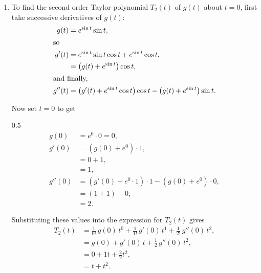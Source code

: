\begin{enumerate}
\begin{enumerate}
                \bigskip

            \item To find the second order Taylor polynomial $T_2(t)$ of $g(t)$ about $t = 0$, first take successive derivatives of $g(t)$:
                \begin{align*}
                    g(t) &= e^{\sin t} \sin t, \\
                    \intertext{so}
                    g'(t) &= e^{\sin t} \sin t \cos t + e^{\sin t} \cos t, \\
                    &= \left(g(t) + e^{\sin t}\right) \cos t, \\
                    \intertext{and finally,}
                    g''(t) &= \left(g'(t) + e^{\sin t} \cos t\right) \cos t - \left(g(t) + e^{\sin t}\right) \sin t.
                \end{align*}

                Now set $t = 0$ to get
                \begin{spreadlines}{0.5\baselineskip}
                    \begin{align*}
                        g(0) &= e^{0} \cdot 0 = 0, \\
                        g'(0) &= \left(g(0) + e^{0}\right) \cdot 1, \\
                        &= 0 + 1, \\
                        &= 1, \\
                        g''(0) &= \left(g'(0) + e^{0} \cdot 1\right) \cdot 1 - \left(g(0) + e^{0}\right) \cdot 0, \\
                        &= (1 + 1) - 0, \\
                        &= 2.
                    \end{align*}
                \end{spreadlines}

                Substituting these values into the expression for $T_2(t)$ gives
                \begin{align*}
                    T_2(t) &= \frac{1}{0!} \, g(0) \, t^0 + \frac{1}{1!} \, g'(0) \, t^1 + \frac{1} {2!} \, g''(0) \, t^2, \\
                    &= g(0) + g'(0) \, t + \frac{1}{2} \, g''(0) \, t^2, \\
                    &= 0 + 1 t + \frac{2}{2} t^2, \\
                    &= t + t^2.
                \end{align*}


\end{enumerate}
\end{enumerate}
